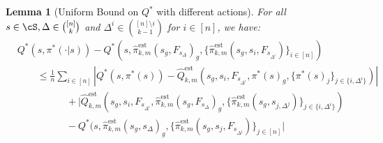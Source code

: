 \documentclass{article}
\theoremstyle{plain}
\newtheorem{lemma}[theorem]{Lemma}
\theoremstyle{definition}
\def\est{\mathrm{est}}
\begin{document}
\begin{lemma}[Uniform Bound on $Q^*$ with different actions] For all $s\in \cS, \Delta\in {[n]\choose k}$ and $\Delta^i \in {[n]\setminus i\choose k-1}$ for $i\in[n]$, we have:
\label{uniform bound}
\begin{align*}&Q^*(s,\pi^*(\cdot|s))-Q^*(s,\hat{\pi}_{k,m}^\est(s_g,F_{s_\Delta})_g, \{\hat{\pi}_{k,m}^\est(s_g, s_i,F_{s_{\Delta^i}})\}_{i\in[n]})\\ &\quad\quad\leq  \frac{1}{n}
\sum_{i\in[n]} \left|Q^*(s, \pi^*(s)) - \hat{Q}^\est_{k,m}(s_g, s_{i},F_{s_{\Delta^i}}, \pi^*(s)_g, \{\pi^*(s)_j\}_{j\in\{i,\Delta^i\}})\right| \\
&\quad\quad\quad\quad\quad+ \bigg|\hat{Q}_{k,m}^\est(s_g, s_{i},F_{s_{\Delta^i}}, \hat{\pi}_{k,m}^\est(s_g,F_{s_\Delta})_g, \{\hat{\pi}_{k,m}^\est(s_g, s_{j,\Delta^j})\}_{j\in\{i,\Delta^i\}}) \\
&\quad\quad\quad\quad\quad- Q^*(s, \hat{\pi}_{k,m}^\est (s_g,s_\Delta)_g, \{\hat{\pi}_{k,m}^\est (s_g, s_{j},F_{s_{\Delta^j}})\}_{j\in[n]}\bigg|\end{align*}
\end{lemma}
\end{document}
